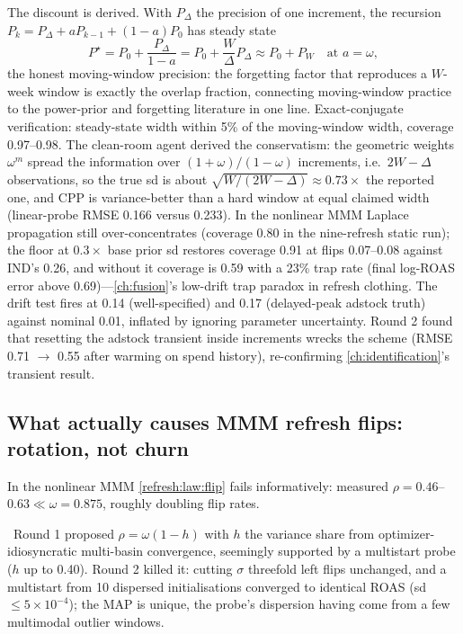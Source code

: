 The discount is derived. With $P_\Delta$ the precision of one increment, the recursion $P_k = P_\Delta + aP_{k-1} + (1-a)P_0$ has steady state
\begin{equation}
P^\star = P_0 + \frac{P_\Delta}{1-a} = P_0 + \frac{W}{\Delta}P_\Delta \approx P_0 + P_W \quad\text{at } a = \omega,
\label{eq:refresh:steady}
\end{equation}
the honest moving-window precision: the forgetting factor that reproduces a $W$-week window is exactly the overlap fraction, connecting moving-window practice to the power-prior and forgetting literature in one line. Exact-conjugate verification: steady-state width within 5\% of the moving-window width, coverage 0.97--0.98. The clean-room agent derived the conservatism: the geometric weights $\omega^m$ spread the information over $(1+\omega)/(1-\omega)$ increments, i.e.\ $2W - \Delta$ observations, so the true sd is about $\sqrt{W/(2W-\Delta)} \approx 0.73\times$ the reported one, and CPP is variance-better than a hard window at equal claimed width (linear-probe RMSE 0.166 versus 0.233). In the nonlinear MMM Laplace propagation still over-concentrates (coverage 0.80 in the nine-refresh static run); the floor at $0.3\times$ base prior sd restores coverage 0.91 at flips 0.07--0.08 against IND's 0.26, and without it coverage is 0.59 with a 23\% trap rate (final log-ROAS error above 0.69)---\cref{ch:fusion}'s low-drift trap paradox in refresh clothing. The drift test fires at 0.14 (well-specified) and 0.17 (delayed-peak adstock truth) against nominal 0.01, inflated by ignoring parameter uncertainty. Round 2 found that resetting the adstock transient inside increments wrecks the scheme (RMSE 0.71 $\to$ 0.55 after warming on spend history), re-confirming \cref{ch:identification}'s transient result.

\subsection{What actually causes MMM refresh flips: rotation, not churn}
\label{refresh:sec:rotation}

In the nonlinear MMM \cref{refresh:law:flip} fails informatively: measured $\rho = 0.46$--$0.63 \ll \omega = 0.875$, roughly doubling flip rates.

\begin{proposition}
\label{refresh:prop:churn}
\tagRefuted\ Round 1 proposed $\rho = \omega(1 - h)$ with $h$ the variance share from optimizer-idiosyncratic multi-basin convergence, seemingly supported by a multistart probe ($h$ up to 0.40). Round 2 killed it: cutting $\sigma$ threefold left flips unchanged, and a multistart from 10 dispersed initialisations converged to identical ROAS (sd $\le 5\times10^{-4}$); the MAP is unique, the probe's dispersion having come from a few multimodal outlier windows.
\end{proposition}

